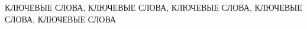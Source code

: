 \abstract %

\noindent КЛЮЧЕВЫЕ СЛОВА, КЛЮЧЕВЫЕ СЛОВА, КЛЮЧЕВЫЕ СЛОВА, КЛЮЧЕВЫЕ СЛОВА, КЛЮЧЕВЫЕ СЛОВА

\lipsum[1-2]
